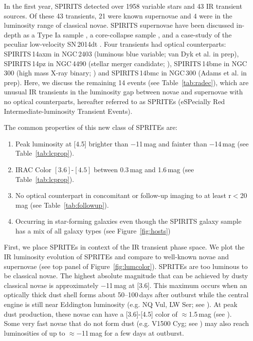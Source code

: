 \documentclass[twocolumn,times]{aastex6}
\begin{document}
In the first year, SPIRITS detected over 1958 variable stars and 43 IR transient sources. Of these 43 transients, 
21 were known supernovae and 4 were in the luminosity range of classical novae. SPIRITS supernovae have been discussed 
in-depth as a Type Ia sample \citep{Johansson2014}, a core-collapse sample \citep{Tinyanont2016}, and a case-study of the peculiar 
low-velocity SN\,2014dt \citep{Fox2016}.  Four transients had optical counterparts: SPIRITS\,14axm in NGC\,2403 (luminous blue variable;
van Dyk et al. in prep), SPIRITS\,14pz in NGC\,4490 (stellar merger candidate; \citealt{Smith2016}), SPIRITS\,14bme in NGC\,300 (high mass
X-ray binary; \citealt{Lau2016}) and SPIRITS\,14bmc in NGC\,300 (Adams et al. in prep). Here, we discuss the remaining 14 events (see Table~\ref{tab:radec}), which are 
unusual IR transients in the luminosity gap between novae and supernovae with no optical counterparts, hereafter referred to as SPRITEs 
(eSPecially Red Intermediate-luminosity Transient Events). 
   
The common properties of this new class of SPRITEs are: 
\begin{enumerate}
\item Peak luminosity at [4.5] brighter than $-$11\,mag and fainter than $-$14\,mag (see Table~\ref{tab:lcprop}).
\item IRAC Color $[3.6]$-$[4.5]$ between 0.3\,mag and 1.6\,mag (see Table~\ref{tab:lcprop}).
\item No optical counterpart in concomitant or follow-up imaging to at least r$<$20\,mag (see Table~\ref{tab:followup}). 
\item Occurring in star-forming galaxies even though the SPIRITS galaxy sample has a mix of all galaxy types (see Figure~\ref{fig:hosts}) 
\end{enumerate}

First, we place SPRITEs in context of the IR transient phase space. We plot the IR luminosity evolution of SPRITEs 
and compare to well-known novae and supernovae (see top panel of Figure~\ref{fig:lumcolor}). SPRITEs are too luminous to be classical
novae.  The highest absolute magnitude that can be achieved by dusty classical novae is approximately $-$11\,mag at [3.6]. This maximum occurs when
an optically thick dust shell forms about 50--100\,days after outburst while the central engine is still near Eddington luminosity (e.g. NQ Vul, LW
Ser; see \citealt{Gehrz1995}).  At peak dust production, these novae can have a [3.6]-[4.5] color of $\approx$1.5\,mag (see \citealt{Ney1978,Gehrz1980}). 
Some very fast novae that do not form dust (e.g. V1500 Cyg; see \citealt{Gallagher1976, Ennis1977}) may also reach luminosities
of up to $\approx-$11\,mag for a few days at outburst.
\end{document}
